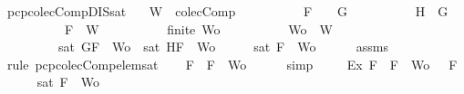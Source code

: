 \begin{isabellebody}
\isamarkupfalse%
\ pcp{\isacharunderscore}colecComp{\isacharunderscore}DIS{\isacharunderscore}sat{}{\isacharcolon}\isanewline
\ \ \ {\isachardoublequoteopen}W\ {\isasymin}\ colecComp{\isachardoublequoteclose}\isanewline
\ \ \ \ \ \ \ \ \ \ {\isachardoublequoteopen}F\ {\isacharequal}\ \isactrlbold {\isasymnot}\ {\isacharparenleft}\isactrlbold {\isasymnot}\ G{\isacharparenright}{\isachardoublequoteclose}\isanewline
\ \ \ \ \ \ \ \ \ \ {\isachardoublequoteopen}H\ {\isacharequal}\ G{\isachardoublequoteclose}\isanewline
\ \ \ \ \ \ \ \ \ \ {\isachardoublequoteopen}F\ {\isasymin}\ W{\isachardoublequoteclose}\isanewline
\ \ \ \ \ \ \ \ \ \ {\isachardoublequoteopen}finite\ Wo{\isachardoublequoteclose}\isanewline
\ \ \ \ \ \ \ \ \ \ {\isachardoublequoteopen}Wo\ {\isasymsubseteq}\ W{\isachardoublequoteclose}\isanewline
\ \ \ \ \ \ \ \ \ {\isachardoublequoteopen}sat\ {\isacharparenleft}{\isacharbraceleft}G{\isacharcomma}F{\isacharbraceright}\ {\isasymunion}\ Wo{\isacharparenright}\ {\isasymor}\ sat\ {\isacharparenleft}{\isacharbraceleft}H{\isacharcomma}F{\isacharbraceright}\ {\isasymunion}\ Wo{\isacharparenright}{\isachardoublequoteclose}\isanewline
%
\isadelimproof
%
\endisadelimproof
%
\isatagproof
{}\isamarkupfalse%
\ {\isacharminus}\isanewline
\ \ \isamarkupfalse%
\ {\isachardoublequoteopen}sat\ {\isacharparenleft}{\isacharbraceleft}F{\isacharbraceright}\ {\isasymunion}\ Wo{\isacharparenright}{\isachardoublequoteclose}\isanewline
\ \ \ \ \isamarkupfalse%
\ assms{\isacharparenleft}{}{\isacharcomma}{}{\isacharcomma}{}{\isacharcomma}{}{\isacharparenright}\ \isamarkupfalse%
\ {\isacharparenleft}rule\ pcp{\isacharunderscore}colecComp{\isacharunderscore}elem{\isacharunderscore}sat{\isacharparenright}\isanewline
\ \ \isamarkupfalse%
\ {\isachardoublequoteopen}F\ {\isasymin}\ {\isacharbraceleft}F{\isacharbraceright}\ {\isasymunion}\ Wo{\isachardoublequoteclose}\isanewline
\ \ \ \ \isamarkupfalse%
\ simp\ \isanewline
\ \ \isamarkupfalse%
\ Ex{}{\isacharcolon}{\isachardoublequoteopen}{\isasymexists}{\isasymA}{\isachardot}\ {\isasymforall}F\ {\isasymin}\ {\isacharparenleft}{\isacharbraceleft}F{\isacharbraceright}\ {\isasymunion}\ Wo{\isacharparenright}{\isachardot}\ {\isasymA}\ {\isasymTurnstile}\ F{\isachardoublequoteclose}\isanewline
\ \ \ \ \isamarkupfalse%
\ {\isacartoucheopen}sat\ {\isacharparenleft}{\isacharbraceleft}F{\isacharbraceright}\ {\isasymunion}\ Wo{\isacharparenright}{\isacartoucheclose}\ \isamarkupfalse%

\end{isabellebody}
